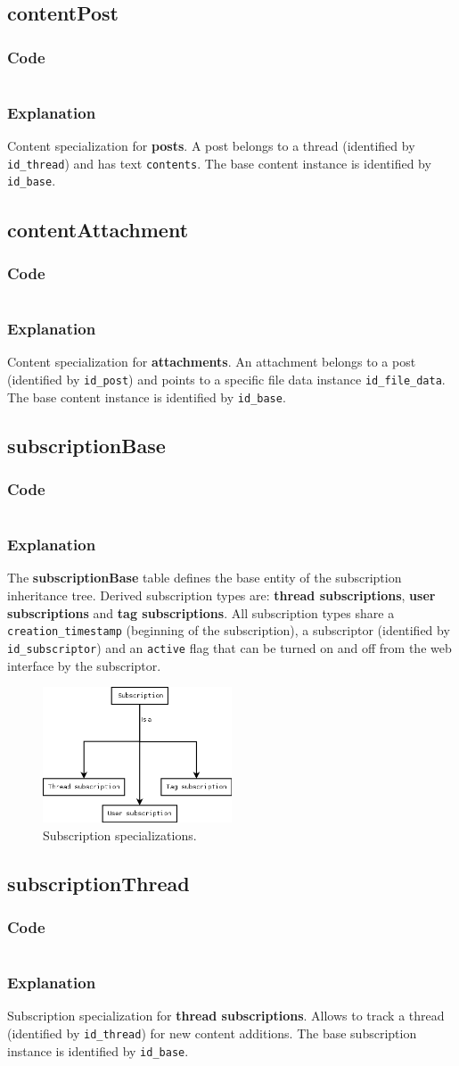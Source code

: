\documentclass[12pt]{report}
\renewcommand\emph{\textbf}
\newcommand{\printSQLtest}[1]
{
    \inputminted[linenos, breaklines, breakbytoken, tabsize=4, fontsize=\footnotesize]{mysql}{#1}
}
\newcommand{\printSQLTablepage}[2]
{
    \newpage
    \subsection{#2}
    \subsubsection{Code}
    \printSQLtest{../sql/parts/#1}
    \subsubsection{Explanation}
}
\begin{document}
                \printSQLTablepage{09_tblContentPost.sql}{contentPost}
                    Content specialization for \emph{posts}. A post belongs to a thread (identified by \texttt{id_thread}) and has text \texttt{contents}.
                    The base content instance is identified by \texttt{id_base}.

                \printSQLTablepage{10_tblContentAttachment.sql}{contentAttachment}
                    Content specialization for \emph{attachments}. An attachment belongs to a post (identified by \texttt{id_post}) and points to a specific file data instance \texttt{id_file_data}.
                    The base content instance is identified by \texttt{id_base}.


                \printSQLTablepage{11_tblSubscriptionBase.sql}{subscriptionBase}
                    The \emph{subscriptionBase} table defines the base entity of the subscription inheritance tree. Derived subscription types are: \emph{thread subscriptions}, \emph{user subscriptions} and \emph{tag subscriptions}.
                    All subscription types share a \texttt{creation_timestamp} (beginning of the subscription), a subscriptor (identified by \texttt{id_subscriptor}) and an \texttt{active} flag that can be turned on and off from the web interface by the subscriptor.

                    \begin{figure}[h]
                    \caption{Subscription specializations.}
                    \centering
                    \includegraphics[width=0.5\textwidth]{td/11subscriptionbase}
                    \end{figure}


                \printSQLTablepage{12_tblSubscriptionThread.sql}{subscriptionThread}
                    Subscription specialization for \emph{thread subscriptions}. Allows to track a thread (identified by \texttt{id_thread}) for new content additions.
                    The base subscription instance is identified by \texttt{id_base}.
\end{document}
